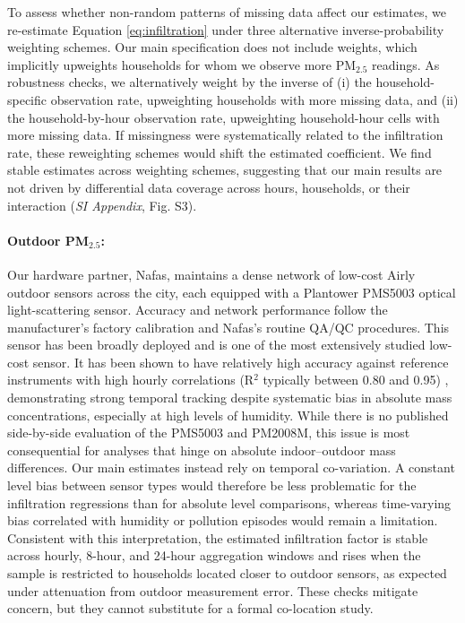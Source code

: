 \documentclass[9pt,twocolumn,twoside]{pnas-new}
\begin{document}
To assess whether non-random patterns of missing data affect our estimates, we re-estimate Equation \ref{eq:infiltration} under three alternative inverse-probability weighting schemes. Our main specification does not include weights, which implicitly upweights households for whom we observe more PM$_{2.5}$ readings. As robustness checks, we alternatively weight by the inverse of (i) the household-specific observation rate, upweighting households with more missing data, and (ii) the household-by-hour observation rate, upweighting household-hour cells with more missing data. If missingness were systematically related to the infiltration rate, these reweighting schemes would shift the estimated coefficient. We find stable estimates across weighting schemes, suggesting that our main results are not driven by differential data coverage across hours, households, or their interaction (\textit{SI Appendix}, Fig. S3).

\paragraph{Outdoor PM$_{2.5}$:} Our hardware partner, Nafas, maintains a dense network of low-cost Airly outdoor sensors across the city, each equipped with a Plantower PMS5003 optical light-scattering sensor. Accuracy and network performance follow the manufacturer’s factory calibration and Nafas’s routine QA/QC procedures. This sensor has been broadly deployed and is one of the most extensively studied low-cost sensor. It has been shown to have relatively high accuracy against reference instruments with high hourly correlations (R$^2$ typically between 0.80 and 0.95) \citep{Sayahi2019, Zheng2018}, demonstrating strong temporal tracking despite systematic bias in absolute mass concentrations, especially at high levels of humidity.
While there is no published side-by-side evaluation of the PMS5003 and PM2008M, this issue is most consequential for analyses that hinge on absolute indoor–outdoor mass differences. Our main estimates instead rely on temporal co-variation. A constant level bias between sensor types would therefore be less problematic for the infiltration regressions than for absolute level comparisons, whereas time-varying bias correlated with humidity or pollution episodes would remain a limitation. Consistent with this interpretation, the estimated infiltration factor is stable across hourly, 8-hour, and 24-hour aggregation windows and rises when the sample is restricted to households located closer to outdoor sensors, as expected under attenuation from outdoor measurement error. These checks mitigate concern, but they cannot substitute for a formal co-location study.
\end{document}

